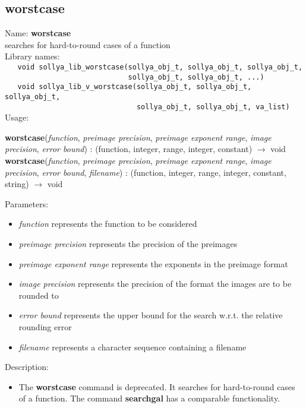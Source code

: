 \subsection{worstcase}
\label{labworstcase}
\noindent Name: \textbf{worstcase}\\
\phantom{aaa}searches for hard-to-round cases of a function\\[0.2cm]
\noindent Library names:\\
\verb|   void sollya_lib_worstcase(sollya_obj_t, sollya_obj_t, sollya_obj_t,|\\
\verb|                             sollya_obj_t, sollya_obj_t, ...)|\\
\verb|   void sollya_lib_v_worstcase(sollya_obj_t, sollya_obj_t, sollya_obj_t,|\\
\verb|                               sollya_obj_t, sollya_obj_t, va_list)|\\[0.2cm]
\noindent Usage: 
\begin{center}
\textbf{worstcase}(\emph{function}, \emph{preimage precision}, \emph{preimage exponent range}, \emph{image precision}, \emph{error bound}) : (\textsf{function}, \textsf{integer}, \textsf{range}, \textsf{integer}, \textsf{constant}) $\rightarrow$ \textsf{void}\\
\textbf{worstcase}(\emph{function}, \emph{preimage precision}, \emph{preimage exponent range}, \emph{image precision}, \emph{error bound}, \emph{filename}) : (\textsf{function}, \textsf{integer}, \textsf{range}, \textsf{integer}, \textsf{constant}, \textsf{string}) $\rightarrow$ \textsf{void}\\
\end{center}
Parameters: 
\begin{itemize}
\item \emph{function} represents the function to be considered
\item \emph{preimage precision} represents the precision of the preimages
\item \emph{preimage exponent range} represents the exponents in the preimage format
\item \emph{image precision} represents the precision of the format the images are to be rounded to
\item \emph{error bound} represents the upper bound for the search w.r.t. the relative rounding error
\item \emph{filename} represents a character sequence containing a filename
\end{itemize}
\noindent Description: \begin{itemize}

\item The \textbf{worstcase} command is deprecated. It searches for hard-to-round cases of
   a function. The command \textbf{searchgal} has a comparable functionality.
\end{itemize}
